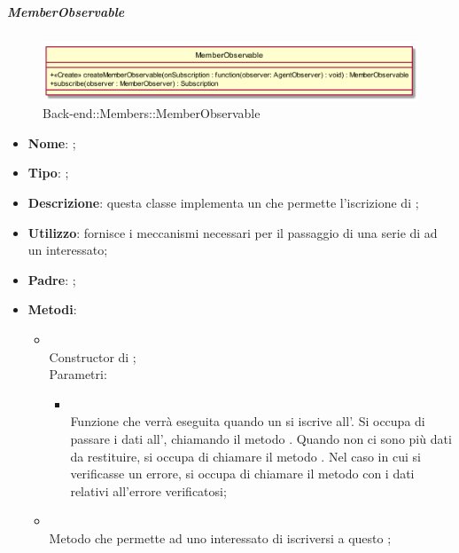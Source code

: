 \hypertarget{MemberObservable_label}{\subparagraph{MemberObservable}}
\begin{figure}[h]
	\centering
	\includegraphics[width=\textwidth,height=\textheight,keepaspectratio]{images/ClassMemberObservable.png}
	\caption{Back-end::Members::MemberObservable}
\end{figure}
\begin{itemize}
	\item \textbf{Nome}: ;
	\item \textbf{Tipo}: ;
	\item \textbf{Descrizione}: questa classe implementa un  che permette l'iscrizione di ;
	\item \textbf{Utilizzo}: fornisce i meccanismi necessari per il passaggio di una serie di  ad un  interessato;
	\item \textbf{Padre}: ;
	\item \textbf{Metodi}:
	\begin{itemize}
		\item[]  \\		Constructor di ;\\
		Parametri:
		\begin{itemize}
			\item {} \\
			Funzione che verrà eseguita quando un  si iscrive all'. Si occupa di passare i dati all', chiamando il metodo . Quando non ci sono più dati da restituire, si occupa di chiamare il metodo . Nel caso in cui si verificasse un errore, si occupa di chiamare il metodo  con i dati relativi all'errore verificatosi;
		\end{itemize}
		\item[]  \\		Metodo che permette ad uno  interessato di iscriversi a questo ;\\

\end{itemize}
\end{itemize}
